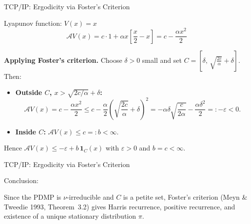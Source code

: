 \documentclass[aspectratio=169]{beamer}
\begin{document}
\begin{frame}{TCP/IP: Ergodicity via Foster's Criterion}

  \begin{block}{Lyapunov function: $V(x) = x$}
    \[
      \mathcal{A}V(x) = c \cdot 1 + \alpha x\left[\frac{x}{2} - x\right]
      = c - \frac{\alpha x^2}{2}
    \]
  \end{block}

  \bigskip
  \textbf{Applying Foster's criterion.} Choose $\delta > 0$ small
  and set $C = \left[\delta,\, \sqrt{\frac{2c}{\alpha}} + \delta\right]$.
  Then:

  \begin{itemize}
    \setlength\itemsep{6pt}
    \item \textbf{Outside $C$, $x > \sqrt{2c/\alpha} + \delta$:}
          \[
            \mathcal{A}V(x) = c - \frac{\alpha x^2}{2}
            \leq c - \frac{\alpha}{2}\left(\sqrt{\frac{2c}{\alpha}}
            + \delta\right)^2
            = -\alpha\delta\sqrt{\frac{c}{2\alpha}}
            - \frac{\alpha\delta^2}{2}
            =: -\varepsilon < 0.
          \]
    \item \textbf{Inside $C$:} $\mathcal{A}V(x) \leq c =: b < \infty$.
  \end{itemize}

  \bigskip
  Hence $\mathcal{A}V(x) \leq -\varepsilon + b\,\mathbf{1}_C(x)$
  with $\varepsilon > 0$ and $b = c < \infty$.

\end{frame}

\begin{frame}{TCP/IP: Ergodicity via Foster's Criterion}
  
  \alert{Conclusion:}

  \bigskip

    Since the PDMP is $\nu$-irreducible and $C$ is a petite set,
    Foster's criterion (Meyn \& Tweedie 1993, Theorem~3.2) gives
    Harris recurrence, positive recurrence, and existence of a
    unique stationary distribution $\pi$.
  

\end{frame}
\end{document}
